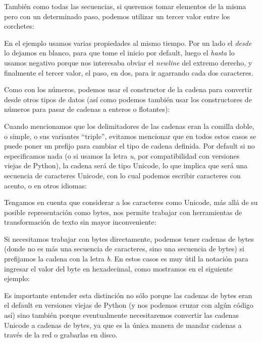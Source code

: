 También como todas las secuencias, si queremos tomar elementos de la misma pero con un determinado paso, podemos utilizar un tercer valor entre los corchetes:


En el ejemplo usamos varias propiedades al mismo tiempo. Por un lado el \textit{desde} lo dejamos en blanco, para que tome el inicio por default, luego el \textit{hasta} lo usamos negativo porque nos interesaba obviar el \textit{newline} del extremo derecho, y finalmente el tercer valor, el paso, en dos, para ir agarrando cada dos caracteres.

Como con los números, podemos usar el constructor  de la cadena para convertir desde otros tipos de datos (así como podemos también usar los constructores de números para pasar de cadenas a enteros o flotantes):


Cuando mencionamos que los delimitadores de las cadenas eran la comilla doble, o simple, o sus variantes ``triple'', evitamos mencionar que en todos estos casos se puede poner un prefijo para cambiar el tipo de cadena definida. Por default si no especificamos nada (o si usamos la letra \textit{u}, por compatibilidad con versiones viejas de Python), la cadena será de tipo Unicode, lo que implica que será una secuencia de caracteres Unicode, con lo cual podemos escribir caracteres con acento, o en otros idiomas:


Tengamos en cuenta que considerar a los caracteres como Unicode, más allá de su posible representación como bytes, nos permite trabajar con herramientas de transformación de texto sin mayor inconveniente:


Si necesitamos trabajar con bytes directamente, podemos tener cadenas de bytes (donde no es más una secuencia de caracteres, sino una secuencia de bytes) si prefijamos la cadena con la letra \textit{b}. En estos casos es muy útil la notación \mip{\x} para ingresar el valor del byte en hexadecimal, como mostramos en el siguiente ejemplo:


Es importante entender esta distinción no sólo porque las cadenas de bytes eran el default en versiones viejas de Python (y nos podemos cruzar con algún código así) sino también porque eventualmente necesitaremos convertir las cadenas Unicode a cadenas de bytes, ya que es la única manera de mandar cadenas a través de la red o grabarlas en disco.

